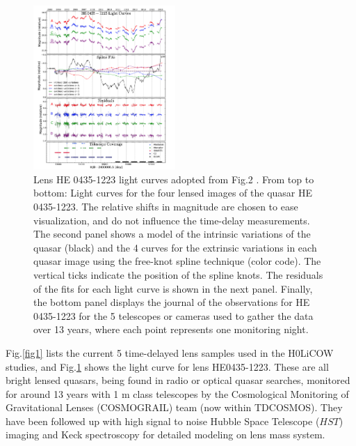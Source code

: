 \documentclass{cosmo}
\begin{document}
    \begin{figure}[h]
        \centering
        \includegraphics[width=0.48\textwidth]{fig2_2.png}
        \caption{Lens HE 0435-1223 light curves adopted from Fig.2 \cite{Bonvin2016}. From top to bottom: Light curves for the four lensed images of the quasar HE 0435-1223. The relative shifts in magnitude are chosen to ease visualization, and do not influence the time-delay measurements. The second panel shows a model of the intrinsic variations of the quasar (black) and the 4 curves for the extrinsic variations in each quasar image using the free-knot spline technique (color code). 
        The vertical ticks indicate the position of the spline knots. The residuals of the fits for each light curve is shown in the next panel. Finally, the bottom panel displays the journal of the observations for HE 0435-1223 for the 5 telescopes or cameras used to gather the data over 13 years, where each point represents one monitoring night.}
        \label{fig2}
    \end{figure}
    
    Fig.\ref{fig1} lists the current 5 time-delayed lens samples used in the H0LiCOW studies, and Fig.\ref{fig2} shows the light curve for lens HE0435-1223. These are all bright lensed quasars, being found in radio or optical quasar searches, monitored for around 13 years with 1 m class telescopes by the Cosmological Monitoring of Gravitational Lenses (COSMOGRAIL) team (now within TDCOSMOS). They have been followed up with high signal to noise Hubble Space Telescope ($\textit{HST}$) imaging and Keck spectroscopy for detailed modeling on lens mass system. 
    
\end{document}
